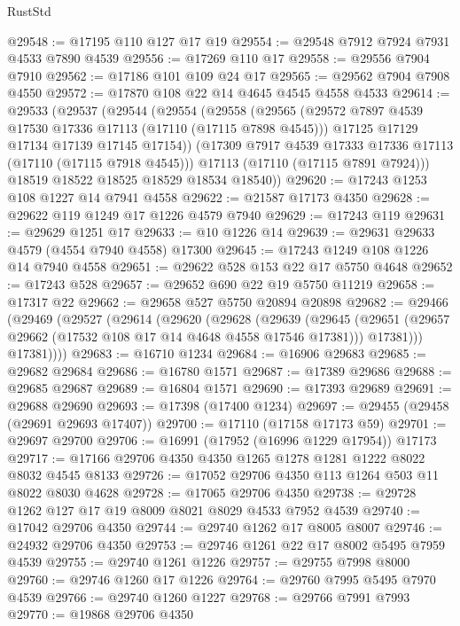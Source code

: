 \begin{lexlean}{RustStd}
\begin{coremodule}
@29548 := @17195 @110 @127 @17 @19
@29554 := @29548 @7912 @7924 @7931 @4533 @7890 @4539
@29556 := @17269 @110 @17
@29558 := @29556 @7904 @7910
@29562 := @17186 @101 @109 @24 @17
@29565 := @29562 @7904 @7908 @4550
@29572 := @17870 @108 @22 @14 @4645 @4545 @4558 @4533
@29614 := @29533
    (@29537
      (@29544
        (@29554
          (@29558
            (@29565
              (@29572 @7897 @4539 @17530 @17336 @17113 (@17110 (@17115 @7898 @4545)))
              @17125
              @17129
              @17134
              @17139
              @17145
              @17154))
          (@17309 @7917 @4539 @17333 @17336 @17113 (@17110 (@17115 @7918 @4545)))
          @17113
          (@17110 (@17115 @7891 @7924)))
        @18519
        @18522
        @18525
        @18529
        @18534
        @18540))
@29620 := @17243 @1253 @108 @1227 @14 @7941 @4558
@29622 := @21587 @17173 @4350
@29628 := @29622 @119 @1249 @17 @1226 @4579 @7940
@29629 := @17243 @119
@29631 := @29629 @1251 @17
@29633 := @10 @1226 @14
@29639 := @29631 @29633 @4579 (@4554 @7940 @4558) @17300
@29645 := @17243 @1249 @108 @1226 @14 @7940 @4558
@29651 := @29622 @528 @153 @22 @17 @5750 @4648
@29652 := @17243 @528
@29657 := @29652 @690 @22 @19 @5750 @11219
@29658 := @17317 @22
@29662 := @29658 @527 @5750 @20894 @20898
@29682 := @29466
    (@29469
      (@29527
        (@29614
          (@29620
            (@29628
              (@29639
                (@29645
                  (@29651 (@29657 @29662 (@17532 @108 @17 @14 @4648 @4558 @17546 @17381)))
                  @17381)))
            @17381))))
@29683 := @16710 @1234
@29684 := @16906 @29683
@29685 := @29682 @29684
@29686 := @16780 @1571
@29687 := @17389 @29686
@29688 := @29685 @29687
@29689 := @16804 @1571
@29690 := @17393 @29689
@29691 := @29688 @29690
@29693 := @17398 (@17400 @1234)
@29697 := @29455 (@29458 (@29691 @29693 @17407))
@29700 := @17110 (@17158 @17173 @59)
@29701 := @29697 @29700
@29706 := @16991 (@17952 (@16996 @1229 @17954)) @17173
@29717 := @17166 @29706 @4350 @4350 @1265 @1278 @1281 @1222 @8022 @8032 @4545 @8133
@29726 := @17052 @29706 @4350 @113 @1264 @503 @11 @8022 @8030 @4628
@29728 := @17065 @29706 @4350
@29738 := @29728 @1262 @127 @17 @19 @8009 @8021 @8029 @4533 @7952 @4539
@29740 := @17042 @29706 @4350
@29744 := @29740 @1262 @17 @8005 @8007
@29746 := @24932 @29706 @4350
@29753 := @29746 @1261 @22 @17 @8002 @5495 @7959 @4539
@29755 := @29740 @1261 @1226
@29757 := @29755 @7998 @8000
@29760 := @29746 @1260 @17 @1226
@29764 := @29760 @7995 @5495 @7970 @4539
@29766 := @29740 @1260 @1227
@29768 := @29766 @7991 @7993
@29770 := @19868 @29706 @4350

\end{coremodule}
\end{lexlean}
